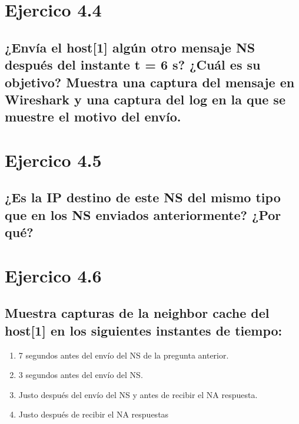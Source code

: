 \section{Ejercico 4.4}
\subsection{¿Envía el host[1] algún otro mensaje NS después del instante t = 6 s? ¿Cuál es su objetivo? Muestra una captura del mensaje en Wireshark y una captura del log en la que se muestre el motivo del envío.}


\section{Ejercico 4.5}
\subsection{¿Es la IP destino de este NS del mismo tipo que en los NS enviados anteriormente? ¿Por qué?}


\section{Ejercico 4.6}
\subsection{Muestra capturas de la neighbor cache del host[1] en los siguientes instantes de tiempo:}

\begin{enumerate}
    \item 7 segundos antes del envío del NS de la pregunta anterior.
    
    \item 3 segundos antes del envío del NS.
    \item Justo después del envío del NS y antes de recibir el NA respuesta.
    \item Justo después de recibir el NA respuestas
\end{enumerate}
